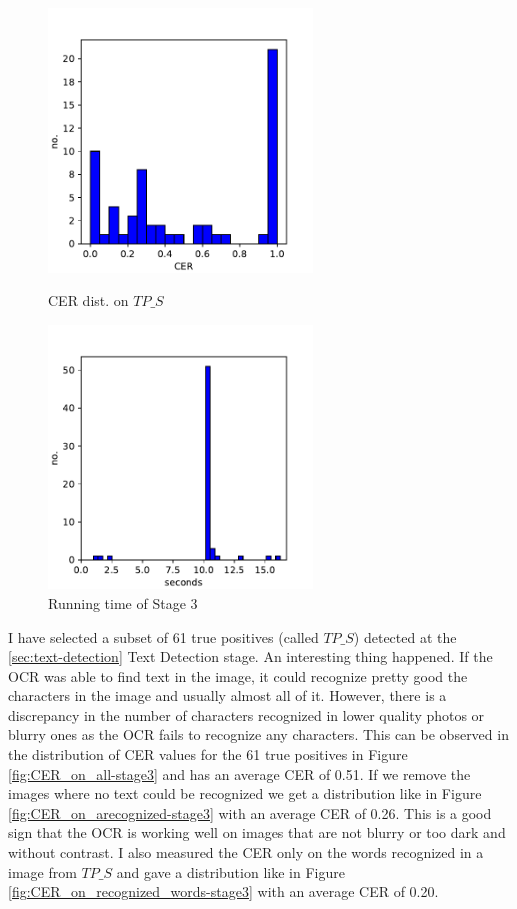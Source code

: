 \begin{figure}
    \centering
    \begin{minipage}[c]{0.5\linewidth}
        \centering
        \includegraphics[height=7cm, keepaspectratio]{img/evaluation/CER_on_all-stage3.pdf}
            \caption{CER dist. on $TP\_S$}
            \label{fig:CER_on_all-stage3}
    \end{minipage}\hfill
    \begin{minipage}[c]{0.5\linewidth}
        \centering
        \includegraphics[height=7cm, keepaspectratio]{img/evaluation/running_time-stage3.pdf}
            \caption{Running time of Stage 3}
            \label{fig:running_time-stage3}
    \end{minipage}\hfill
\end{figure}

I have selected a subset of 61 true positives (called $TP\_S$) detected at the \ref{sec:text-detection} Text Detection stage. An interesting thing happened. If the OCR was able to find text in the image, it could recognize pretty good the characters in the image and usually almost all of it. However, there is a discrepancy in the number of characters recognized in lower quality photos or blurry ones as the OCR fails to recognize any characters. This can be observed in the distribution of CER values for the 61 true positives in Figure \ref{fig:CER_on_all-stage3} and has an average CER of 0.51. If we remove the images where no text could be recognized we get a distribution like in Figure \ref{fig:CER_on_arecognized-stage3} with an average CER of 0.26. This is a good sign that the OCR is working well on images that are not blurry or too dark and without contrast. I also measured the CER only on the words recognized in a image from $TP\_S$ and gave a distribution like in Figure \ref{fig:CER_on_recognized_words-stage3} with an average CER of 0.20.

